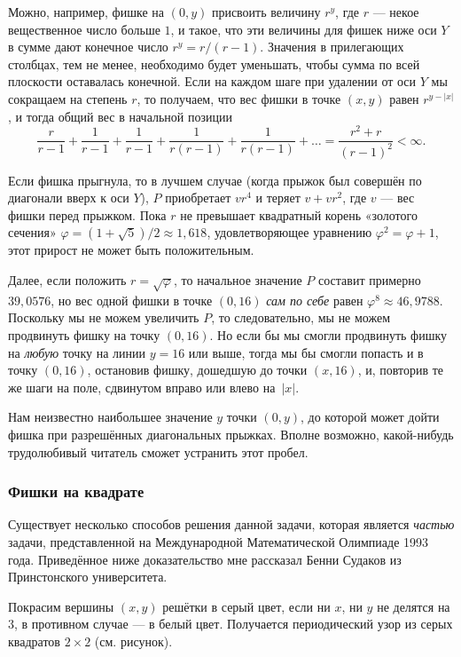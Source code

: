 Можно, например, фишке на $(0, y)$ присвоить величину $r^y$, где $r$ --- некое вещественное число больше $1$, и такое, что эти величины для фишек ниже оси $Y$ в сумме дают конечное число $r^y = r / (r-1)$.
Значения в прилегающих столбцах, тем не менее, необходимо будет уменьшать, чтобы сумма по всей плоскости оставалась конечной.
Если на каждом шаге при удалении от оси $Y$ мы сокращаем на степень $r$, то получаем, что вес фишки в точке $(x, y)$ равен $r^{y - |x|}$, и тогда общий вес в начальной позиции 
\[\frac r{r-1} + \frac 1{r-1} +\frac 1{r-1} +\frac 1{r(r-1)} +\frac 1{r(r-1)} + \dots =\frac{r^2+r}{(r-1)^2} <\infty .\]

Если фишка прыгнула, то в лучшем случае (когда прыжок был совершён по диагонали вверх к оси $Y$), $P$ приобретает $vr^4$ и теряет $v+vr^2$, где $v$ --- вес фишки перед прыжком.
Пока $r$ не превышает квадратный корень «золотого сечения» $\varphi=(1+\sqrt5)/2\approx 1{,}618$, удовлетворяющее уравнению $\varphi^2=\varphi+1$, этот прирост не может быть положительным.

Далее, если положить $r = \sqrt{\varphi}$, то начальное значение $P$ составит примерно $39{,}0576$, но вес одной фишки в точке $(0, 16)$ \emph{сам по себе} равен $\varphi^8\approx 46{,}9788$.
Поскольку мы не можем увеличить $P$, то следовательно, мы не можем продвинуть фишку на точку $(0, 16)$.
Но если бы мы смогли продвинуть фишку на \emph{любую} точку на линии $y = 16$ или выше, тогда мы бы смогли попасть и в точку $(0, 16)$, остановив фишку, дошедшую до точки $(x, 16)$, и, повторив те же шаги на поле, сдвинутом вправо или влево на~$|x|$.
\heart

Нам неизвестно наибольшее значение $y$ точки $(0, y)$, до которой может дойти фишка при разрешённых диагональных прыжках.
Вполне возможно, какой-нибудь трудолюбивый читатель сможет устранить этот пробел.

\subsubsection*{Фишки на квадрате}%

Существует несколько способов решения данной задачи, которая является \emph{частью} задачи, представленной на Международной Математической Олимпиаде 1993 года.
Приведённое ниже доказательство мне рассказал Бенни Судаков из Принстонского университета.

\medskip

Покрасим вершины $(x, y)$ решётки в серый цвет, если ни $x$, ни $y$ не делятся на $3$, в противном случае --- в белый цвет.
Получается периодический узор из серых квадратов $2\times 2$ (см. рисунок). 

